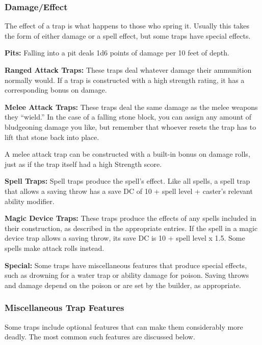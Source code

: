 \documentclass{article}
\begin{document}
\vspace{12pt}
\subsubsection*{\textbf{Damage/Effect}}

The effect of a trap is what happens to those who spring it. Usually this takes 
the form of either damage or a spell effect, but some traps have special effects.

\textbf{Pits:} Falling into a pit deals 1d6 points of damage per 10 feet of depth. 

\textbf{Ranged Attack Traps:} These traps deal whatever damage their ammunition 
normally would. If a trap is constructed with a high strength rating, it has a 
corresponding bonus on damage.

\textbf{Melee Attack Traps:} These traps deal the same damage as the melee weapons 
they ``wield.'' In the case of a falling stone block, you can assign any amount 
of bludgeoning damage you like, but remember that whoever resets the trap has to 
lift that stone back into place. 

A melee attack trap can be constructed with a built-in bonus on damage rolls, just 
as if the trap itself had a high Strength score. 

\textbf{Spell Traps:} Spell traps produce the spell's effect\textit{. }Like all 
spells, a spell trap that allows a saving throw has a save DC of 10 + spell level 
+ caster's relevant ability modifier.

\textbf{Magic Device Traps:} These traps produce the effects of any spells included 
in their construction, as described in the appropriate entries\textit{. }If the 
spell in a magic device trap allows a saving throw, its save DC is 10 + spell level 
x $ $1.5. Some spells make attack rolls instead.

\textbf{Special:} Some traps have miscellaneous features that produce special effects, 
such as drowning for a water trap or ability damage for poison. Saving throws and 
damage depend on the poison or are set by the builder, as appropriate.

\vspace{12pt}
\subsubsection*{\textbf{Miscellaneous Trap Features}}

Some traps include optional features that can make them considerably more deadly. 
The most common such features are discussed below.
\end{document}
